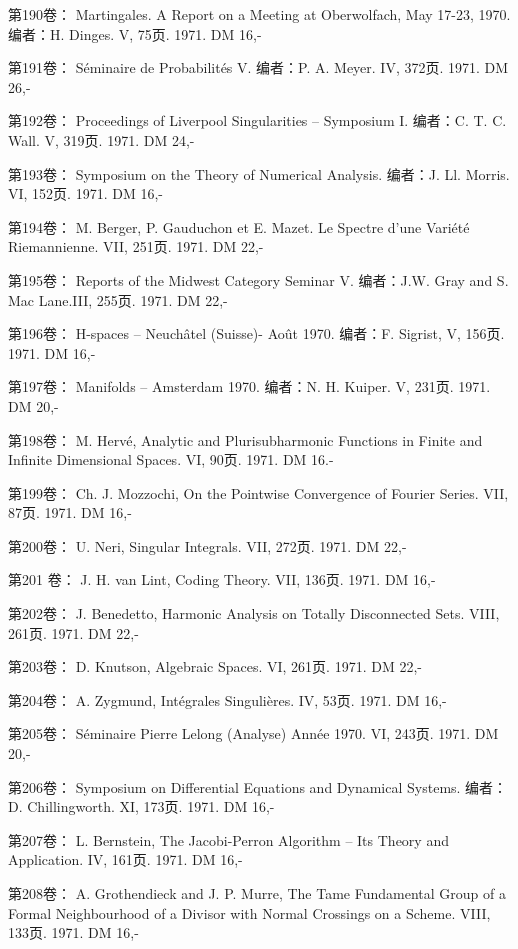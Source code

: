 第190卷： Martingales. A Report on a Meeting at Oberwolfach, May 17-23, 1970. 编者：H. Dinges. V, 75页. 1971. DM 16,-

第191卷： Séminaire de Probabilités V. 编者：P. A. Meyer. IV, 372页. 1971. DM 26,-

第192卷： Proceedings of Liverpool Singularities -- Symposium I. 编者：C. T. C. Wall. V, 319页. 1971. DM 24,-

第193卷： Symposium on the Theory of Numerical Analysis. 编者：J. Ll. Morris. VI, 152页. 1971. DM 16,-

第194卷： M. Berger, P. Gauduchon et E. Mazet. Le Spectre d'une Variété Riemannienne. VII, 251页. 1971. DM 22,-

第195卷： Reports of the Midwest Category Seminar V. 编者：J.W. Gray and S. Mac Lane.III, 255页. 1971. DM 22,-

第196卷： H-spaces -- Neuchâtel (Suisse)- Août 1970. 编者：F. Sigrist, V, 156页. 1971. DM 16,-

第197卷： Manifolds -- Amsterdam 1970. 编者：N. H. Kuiper. V, 231页. 1971. DM 20,-

第198卷： M. Hervé, Analytic and Plurisubharmonic Functions in Finite and Infinite Dimensional Spaces. VI, 90页. 1971. DM 16.-

第199卷： Ch. J. Mozzochi, On the Pointwise Convergence of Fourier Series. VII, 87页. 1971. DM 16,-

第200卷： U. Neri, Singular Integrals. VII, 272页. 1971. DM 22,-

第201 卷： J. H. van Lint, Coding Theory. VII, 136页. 1971. DM 16,-

第202卷： J. Benedetto, Harmonic Analysis on Totally Disconnected Sets. VIII, 261页. 1971. DM 22,-

第203卷： D. Knutson, Algebraic Spaces. VI, 261页. 1971. DM 22,-

第204卷： A. Zygmund, Intégrales Singulières. IV, 53页. 1971. DM 16,-

第205卷： Séminaire Pierre Lelong (Analyse) Année 1970. VI, 243页. 1971. DM 20,-

第206卷： Symposium on Differential Equations and Dynamical Systems. 编者：D. Chillingworth. XI, 173页. 1971. DM 16,-

第207卷： L. Bernstein, The Jacobi-Perron Algorithm -- Its Theory and Application. IV, 161页. 1971. DM 16,-

第208卷： A. Grothendieck and J. P. Murre, The Tame Fundamental Group of a Formal Neighbourhood of a Divisor with Normal Crossings on a Scheme. VIII, 133页. 1971. DM 16,-

